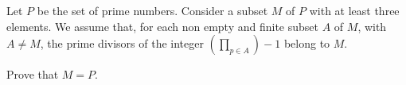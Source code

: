 Let $P$ be the set of prime numbers. Consider a subset $M$ of $P$ with at least three elements. We assume that, for each non empty and finite subset $A$ of $M$,  with $A \neq M$,  the prime divisors of the integer $( \prod_{p \in A} ) - 1$ belong to $M$.

Prove that $M = P$.